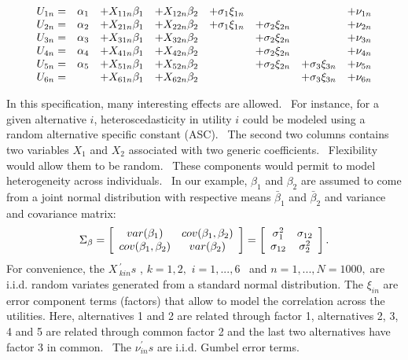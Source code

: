 \documentclass[12pt]{memoir}
\begin{document}
\begin{equation}%
\begin{array}
[c]{cccccccc}%
U_{1n}= & \alpha_{1} & +X_{11n}\beta_{1} & +X_{12n}\beta_{2} & +\sigma_{1}%
\xi_{1n} &  &  & +\nu_{1n}\\
U_{2n}= & \alpha_{2} & +X_{21n}\beta_{1} & +X_{22n}\beta_{2} & +\sigma_{1}%
\xi_{1n} & +\sigma_{2}\xi_{2n} &  & +\nu_{2n}\\
U_{3n}= & \alpha_{3} & +X_{31n}\beta_{1} & +X_{32n}\beta_{2} &  & +\sigma
_{2}\xi_{2n} &  & +\nu_{3n}\\
U_{4n}= & \alpha_{4} & +X_{41n}\beta_{1} & +X_{42n}\beta_{2} &  & +\sigma
_{2}\xi_{2n} &  & +\nu_{4n}\\
U_{5n}= & \alpha_{5} & +X_{51n}\beta_{1} & +X_{52n}\beta_{2} &  & +\sigma
_{2}\xi_{2n} & +\sigma_{3}\xi_{3n} & +\nu_{5n}\\
U_{6n}= &  & +X_{61n}\beta_{1} & +X_{62n}\beta_{2} &  &  & +\sigma_{3}\xi_{3n}
& +\nu_{6n}%
\end{array}
\label{General process}%
\end{equation}


In this specification, many interesting effects are allowed. \ For instance,
for a given alternative $i$, heteroscedasticity in utility $i$ could be
modeled using a random alternative specific constant (ASC). \ The second two
columns contains two variables $X_{1}$ and $X_{2}$ associated with two generic
coefficients. \ Flexibility would allow them to be random. \ These components
would permit to model heterogeneity across individuals. \ In our example,
$\beta_{1}$ and $\beta_{2}$ are assumed to come from a joint normal
distribution with respective means $\bar{\beta}_{1}$ and $\bar{\beta}_{2}$ and
variance and covariance matrix:%
\begin{equation}
\Sigma_{\beta}=\left[
\begin{array}
[c]{cc}%
var(\beta_{1}) & cov(\beta_{1},\beta_{2})\\
cov(\beta_{1},\beta_{2}) & var(\beta_{2})
\end{array}
\right]  =\left[
\begin{array}
[c]{cc}%
\sigma_{1}^{2} & \sigma_{12}\\
\sigma_{12} & \sigma_{2}^{2}%
\end{array}
\right]  . \label{varcov of beta}%
\end{equation}
For convenience, the $X\,_{kin}^{\prime}s$ , $k=1,2,$ $i=1,...,6$ \ and
$n=1,...,N=1000,\;$are i.i.d. random variates generated from a standard normal
distribution. The $\xi_{in}$ are error component terms (factors) that allow to
model the correlation across the utilities. Here, alternatives 1 and 2 are
related through factor 1, alternatives 2, 3, 4 and 5 are related through
common factor 2 and the last two alternatives have factor 3 in common. \ The
$\nu_{in}^{\prime}s$ are i.i.d. Gumbel error terms.
\end{document}

